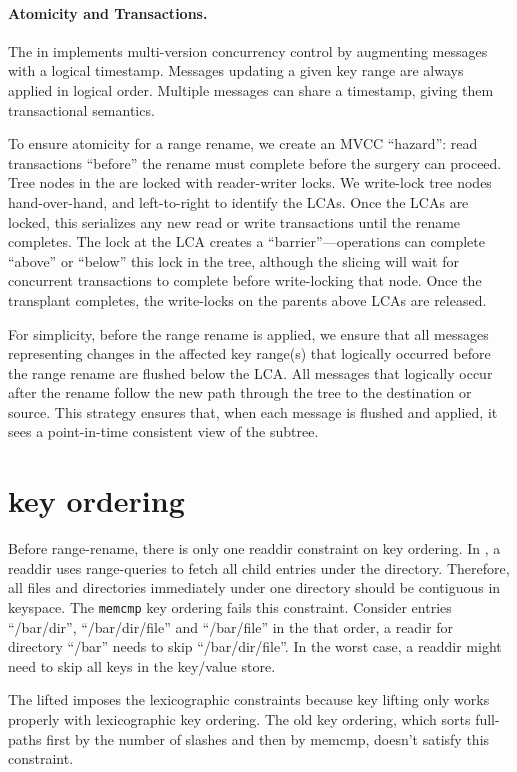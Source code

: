 \paragraph{Atomicity and Transactions.}
The \fti in \betrfs implements \bets multi-version concurrency control by
augmenting messages with a logical timestamp.
Messages updating a given key range are always applied in logical order.
Multiple messages can share a timestamp, giving them transactional semantics.

To ensure atomicity for a range rename, we create an MVCC ``hazard'':
read transactions ``before'' the rename must complete before the surgery
can proceed.
Tree nodes in the \bet are locked with reader-writer locks.
We write-lock tree nodes hand-over-hand, and left-to-right to identify
the LCAs.
Once the LCAs are locked, this serializes any new read or write
transactions until the rename completes.
The lock at the LCA creates a ``barrier''---operations can complete ``above'' or
``below'' this lock in the tree, although the slicing will wait for concurrent
transactions to complete before write-locking that node.
Once the transplant completes, the write-locks on the parents above LCAs are
released.

For simplicity, before the range rename is applied, we ensure that all messages
representing changes in the affected key range(s) that logically occurred before
the range rename are flushed below the LCA.
All messages that logically occur after the rename follow the new path through
the tree to the destination or source.
This strategy ensures that, when each message is flushed and applied, it sees a
point-in-time consistent view of the subtree.

\section{\betrfs key ordering}

Before range-rename, there is only one readdir constraint on \betrfs key
ordering.
In \betrfs, a readdir uses range-queries to fetch all child entries under the
directory.
Therefore, all files and directories immediately under one directory should be
contiguous in keyspace.
The \texttt{memcmp} key ordering fails this constraint.
Consider entries ``/bar/dir'', ``/bar/dir/file'' and ``/bar/file'' in the that
order, a readir for directory ``/bar'' needs to skip ``/bar/dir/file''.
In the worst case, a readdir might need to skip all keys in the key/value store.

The lifted \bet imposes the lexicographic constraints because key lifting only
works properly with lexicographic key ordering.
The old \betrfs key ordering, which sorts full-paths first by the number of
slashes and then by memcmp, doesn't satisfy this constraint.

